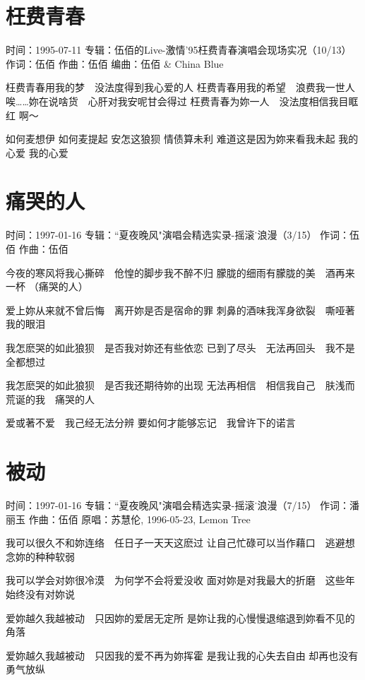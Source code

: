 \documentclass[UTF8,a4paper,oneside,twocolumn,12pt]{ctexbook}
\newcommand{\infopair}[2]{\textbullet #1：#2}
\newcommand{\zc}[1][伍佰]{\infopair{作词}{#1}}
\newcommand{\zq}[1][伍佰]{\infopair{作曲}{#1}}
\newcommand{\bq}[1][伍佰]{\infopair{编曲}{#1}}
\newcommand{\zj}[1]{\infopair{专辑}{#1}}
\newcommand{\yc}[1]{\infopair{原唱}{#1}}
\newcommand{\sj}[1]{\infopair{时间}{#1}}
\newenvironment{info}{\begin{flushleft}\kaishu
	}
	{\end{flushleft}\normalsize\yahei\par}
\newenvironment{lyric}{
	}
{}
\begin{document}
\section{枉费青春}
\begin{info}
	\sj{1995-07-11}
	\zj{伍佰的Live-激情'95枉费青春演唱会现场实况（10/13）}
	\zc
	\zq
	\bq[伍佰 \& China Blue]
\end{info}
\begin{lyric}
	枉费青春用我的梦　没法度得到我心爱的人
	枉费青春用我的希望　浪费我一世人
	唉……妳在说啥货　心肝对我安呢甘会得过
	枉费青春为妳一人　没法度相信我目眶红
	啊～

	如何麦想伊
	如何麦提起
	安怎这狼狈
	情债算未利
	难道这是因为妳来看我未起
	我的心爱
	我的心爱
\end{lyric}

\section{痛哭的人}
\begin{info}
	\sj{1997-01-16}
	\zj{``夏夜晚风"演唱会精选实录-摇滚˙浪漫（3/15）}
	\zc
	\zq
\end{info}
\begin{lyric}
	今夜的寒风将我心撕碎　伧惶的脚步我不醉不归
	朦胧的细雨有朦胧的美　酒再来一杯 （痛哭的人）

	爱上妳从来就不曾后悔　离开妳是否是宿命的罪
	刺鼻的酒味我浑身欲裂　嘶哑著我的眼泪

	我怎麽哭的如此狼狈　是否我对妳还有些依恋
	已到了尽头　无法再回头　我不是全都想过

	我怎麽哭的如此狼狈　是否我还期待妳的出现
	无法再相信　相信我自己　肤浅而荒诞的我　痛哭的人

	爱或著不爱　我己经无法分辨
	要如何才能够忘记　我曾许下的诺言
\end{lyric}

\section{被动}
\begin{info}
	\sj{1997-01-16}
	\zj{``夏夜晚风"演唱会精选实录-摇滚˙浪漫（7/15）}
	\zc[潘丽玉]
	\zq
	\yc{苏慧伦, 1996-05-23, Lemon Tree}
\end{info}
\begin{lyric}
	我可以很久不和妳连络　任日子一天天这麽过
	让自己忙碌可以当作藉口　逃避想念妳的种种软弱

	我可以学会对妳很冷漠　为何学不会将爱没收
	面对妳是对我最大的折磨　这些年始终没有对妳说

	爱妳越久我越被动　只因妳的爱居无定所
	是妳让我的心慢慢退缩退到妳看不见的角落

	爱妳越久我越被动　只因我的爱不再为妳挥霍
	是我让我的心失去自由  却再也没有勇气放纵
\end{lyric}
\end{document}
